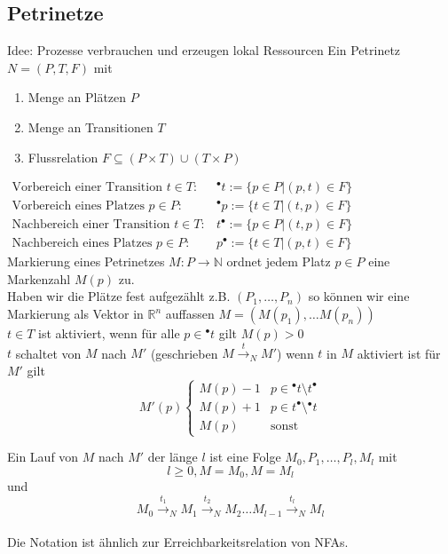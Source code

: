 \documentclass[11pt]{scrartcl}
\begin{document}
\subsection{Petrinetze}

Idee: Prozesse verbrauchen und erzeugen lokal Ressourcen
Ein Petrinetz $N=(P,T,F)$ mit
\begin{enumerate}
	\item Menge an Plätzen $P$
    \item Menge an Transitionen $T$
    \item Flussrelation $F\subseteq (P \times T) \cup (T \times P)$
\end{enumerate}

$\begin{array}{lc}
\text{Vorbereich einer Transition } t\in T:		& {}^\bullet t := \{ p \in P | (p,t) \in F\} \\
\text{Vorbereich eines Platzes } p\in P:		& {}^\bullet p := \{ t \in T | (t,p) \in F\} \\
\text{Nachbereich einer Transition } t \in T:	& t^\bullet := \{ p \in P | (t,p) \in F\} \\
\text{Nachbereich eines Platzes } p \in P:		& p^\bullet := \{ t \in T | (p,t) \in F\}
\end{array}$ \\

Markierung eines Petrinetzes $M: P \rightarrow \mathbb{N}$ ordnet jedem Platz $p\in P$ eine Markenzahl $M(p)$ zu. \\
Haben wir die Plätze fest aufgezählt z.B. $(P_1,\dots,P_n)$ so können wir eine Markierung als Vektor in $\mathbb{R}^n$ auffassen $M=(M(p_1),\dots M(p_n))$ \\

$t\in T$ ist aktiviert, wenn für alle $p\in {}^\bullet t $ gilt $M(p)>0$ \\

$t$ schaltet von $M$ nach $M'$ (geschrieben $M \stackrel{t}{\rightarrow}_N M'$) wenn $t$ in $M$ aktiviert ist für $M'$ gilt \[M'(p) \left\{
\begin{array}{lc}
M(p)-1 & p \in {}^\bullet t \setminus t^\bullet \\
M(p)+1 & p \in t^\bullet \setminus {}^\bullet t \\
M(p) & \text{sonst}
\end{array} \right. \]

Ein Lauf von $M$ nach $M'$ der länge $l$ ist eine Folge $M_0,P_1,\dots,P_l,M_l$ mit
\[l \geq 0, M=M_0, M=M_l\] und
\[M_0\stackrel{t_1}{\rightarrow}_N M_1 \stackrel{t_2}{\rightarrow}_NM_2 \dots M_{l-1} \stackrel{t_l}{\rightarrow}_NM_l\] \\
Die Notation ist ähnlich zur Erreichbarkeitsrelation von NFAs. \\
\end{document}
